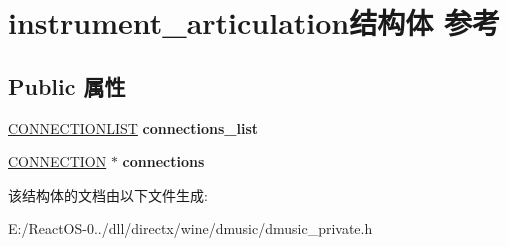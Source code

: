 \hypertarget{structinstrument__articulation}{}\section{instrument\+\_\+articulation结构体 参考}
\label{structinstrument__articulation}
\subsection*{Public 属性}
\begin{DoxyCompactItemize}
\item 
\mbox{\label{structinstrument__articulation_afba2f59f2e857c819117b770074b915b}} 
\hyperlink{struct___c_o_n_n_e_c_t_i_o_n_l_i_s_t}{C\+O\+N\+N\+E\+C\+T\+I\+O\+N\+L\+I\+ST} {\bfseries connections\+\_\+list}
\item 
\mbox{\label{structinstrument__articulation_a8c279be020390ca4781b202e8fab153c}} 
\hyperlink{struct___c_o_n_n_e_c_t_i_o_n}{C\+O\+N\+N\+E\+C\+T\+I\+ON} $\ast$ {\bfseries connections}
\end{DoxyCompactItemize}


该结构体的文档由以下文件生成\+:\begin{DoxyCompactItemize}
\item 
E\+:/\+React\+O\+S-\/0../dll/directx/wine/dmusic/dmusic\+\_\+private.\+h\end{DoxyCompactItemize}
